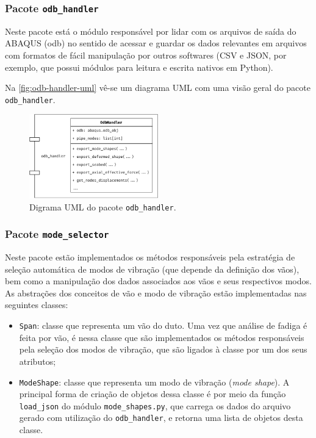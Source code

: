\subsubsection{Pacote \texttt{odb\_handler}}


Neste pacote está o módulo responsável por lidar com os arquivos de saída do ABAQUS (odb) no sentido de acessar e guardar os dados relevantes em arquivos com formatos de fácil manipulação por outros softwares (CSV e JSON, por exemplo, que possui módulos para leitura e escrita nativos em Python).

Na \autoref{fig:odb-handler-uml} vê-se um diagrama UML com uma visão geral do pacote \texttt{odb\_handler}.

\begin{figure}[!ht]
    \centering
    \caption{Digrama UML do pacote \texttt{odb\_handler}.}\label{fig:odb-handler-uml}
    \includegraphics[width=0.5\textwidth]{imagens/odb-handler-uml}
\end{figure}


\subsubsection{Pacote \texttt{mode\_selector}}


Neste pacote estão implementados os métodos responsáveis pela estratégia de seleção automática de modos de vibração (que depende da definição dos vãos), bem como a manipulação dos dados associados aos vãos e seus respectivos modos. As abstrações dos conceitos de vão e modo de vibração estão implementadas nas seguintes classes:

\begin{itemize}
    \item \texttt{Span}: classe que representa um vão do duto. Uma vez que análise de fadiga é feita por vão, é nessa classe que são implementados os métodos responsáveis pela seleção dos modos de vibração, que são ligados à classe por um dos seus atributos;

    \item \texttt{ModeShape}: classe que representa um modo de vibração (\textit{mode shape}). A principal forma de criação de objetos dessa classe é por meio da função \texttt{load\_json} do módulo \texttt{mode\_shapes.py}, que carrega os dados do arquivo gerado com utilização do \texttt{odb\_handler}, e retorna uma lista de objetos desta classe.
\end{itemize}

